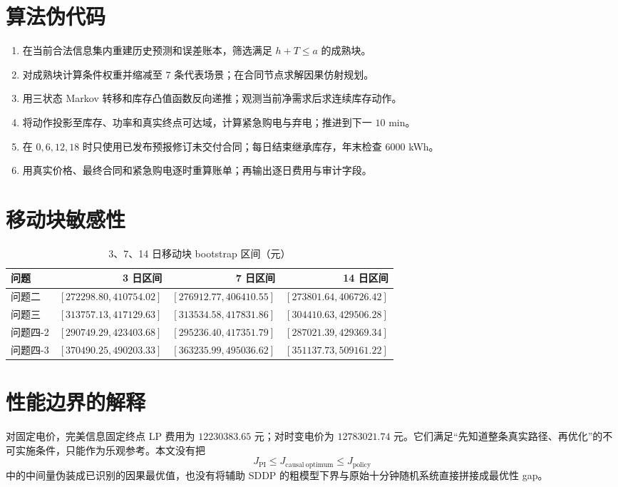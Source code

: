 \documentclass[UTF8,a4paper,zihao=-4,fontset=mac]{ctexart}
\begin{document}
\appendix
\section{算法伪代码}
\begin{enumerate}
  \item 在当前合法信息集内重建历史预测和误差账本，筛选满足 $h+T\le a$ 的成熟块。
  \item 对成熟块计算条件权重并缩减至 $7$ 条代表场景；在合同节点求解因果仿射规划。
  \item 用三状态 Markov 转移和库存凸值函数反向递推；观测当前净需求后求连续库存动作。
  \item 将动作投影至库存、功率和真实终点可达域，计算紧急购电与弃电；推进到下一 $10$ min。
  \item 在 $0,6,12,18$ 时只使用已发布预报修订未交付合同；每日结束继承库存，年末检查 $6000$ kWh。
  \item 用真实价格、最终合同和紧急购电逐时重算账单；再输出逐日费用与审计字段。
\end{enumerate}

\section{移动块敏感性}
\begin{table}[H]\centering\small
\caption{3、7、14 日移动块 bootstrap 区间（元）}\label{tab:bootstrap-sensitivity}
\begin{tabular}{l r@{\quad}r@{\quad}r}
\toprule
问题 & 3 日区间 & 7 日区间 & 14 日区间\\\midrule
问题二 & $[272298.80,410754.02]$ & $[276912.77,406410.55]$ & $[273801.64,406726.42]$\\
问题三 & $[313757.13,417129.63]$ & $[313534.58,417831.86]$ & $[304410.63,429506.28]$\\
问题四-2 & $[290749.29,423403.68]$ & $[295236.40,417351.79]$ & $[287021.39,429369.34]$\\
问题四-3 & $[370490.25,490203.33]$ & $[363235.99,495036.62]$ & $[351137.73,509161.22]$\\
\bottomrule
\end{tabular}
\end{table}

\section{性能边界的解释}
对固定电价，完美信息固定终点 LP 费用为 $12230383.65$ 元；对时变电价为 $12783021.74$ 元。它们满足“先知道整条真实路径、再优化”的不可实施条件，只能作为乐观参考。本文没有把
\begin{equation}
J_{\mathrm{PI}}\le J_{\mathrm{causal\ optimum}}\le J_{\mathrm{policy}}
\end{equation}
中的中间量伪装成已识别的因果最优值，也没有将辅助 SDDP 的粗模型下界与原始十分钟随机系统直接拼接成最优性 gap。
\end{document}
